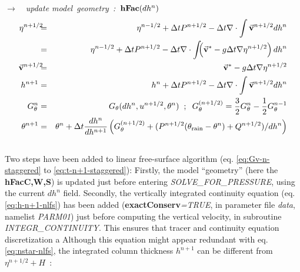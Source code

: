 \hspace{3cm}$\longrightarrow$~~{\it update model~geometry~:~}${\bf hFac}(dh^n)$\\
\begin{eqnarray}
\eta^{n+1/2} \hspace{-2mm} & = & 
\eta^{n-1/2} + \Delta t P^{n+1/2} - \Delta t
  \nabla \cdot \int \vec{\bf v}^{n+1/2} dh^{n} \nonumber \\
             & = & \eta^{n-1/2} + \Delta t P^{n+1/2} - \Delta t
  \nabla \cdot \int \!\!\! \left( \vec{\bf v}^* - g \Delta t \nabla \eta^{n+1/2} \right) dh^{n}
\label{eq:nstar-nlfs} \\
\vec{\bf v}^{n+1/2}\hspace{-2mm} & = & 
\vec{\bf v}^{*} - g \Delta t \nabla \eta^{n+1/2}
\label{eq:v-n+1-nlfs} \\
h^{n+1} & = & h^{n} + \Delta t P^{n+1/2} - \Delta t
  \nabla \cdot \int \vec{\bf v}^{n+1/2} dh^{n}
\label{eq:h-n+1-nlfs} \\
G_{\theta}^{n} & = & G_{\theta} ( dh^{n}, u^{n+1/2}, \theta^{n} )
\hspace{+2mm};\hspace{+2mm}
G_{\theta}^{(n+1/2)} = \frac{3}{2} G_{\theta}^{n} - \frac{1}{2} G_{\theta}^{n-1}
\label{eq:Gt-n-nlfs} \\
\theta^{n+1} & = &\theta^{n} + \Delta t \frac{dh^n}{dh^{n+1}} \left( 
G_{\theta}^{(n+1/2)}
+( P^{n+1/2} (\theta_{\mathrm{rain}}-\theta^n) + Q^{n+1/2})/dh^n \right)
\nonumber \\
& & \label{eq:t-n+1-nlfs}
\end{eqnarray}
Two steps have been added to linear free-surface algorithm 
(eq. \ref{eq:Gv-n-staggered} to \ref{eq:t-n+1-staggered}):
Firstly, the model ``geometry''
(here the {\bf hFacC,W,S}) is updated just before entering {\it
SOLVE\_FOR\_PRESSURE}, using the current $dh^{n}$ field.
Secondly, the vertically integrated continuity equation 
(eq.\ref{eq:h-n+1-nlfs}) has been added ({\bf exactConserv}{\em =TRUE},
in parameter file {\em data}, namelist {\em PARM01})
just before computing the vertical velocity, in subroutine
{\em INTEGR\_CONTINUITY}. This ensures that tracer and continuity equation
discretization  a Although this equation might appear 
redundant with eq.\ref{eq:nstar-nlfs}, the integrated column
thickness $h^{n+1}$ can be different from $\eta^{n+1/2} + H$~:
